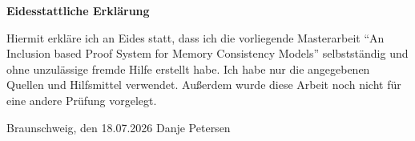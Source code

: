 \documentclass[a4paper,twoside,12pt, english]{article}
\begin{document}
\begin{appendix}


\end{appendix}
\pagebreak
\thispagestyle{empty}
\noindent \textbf{\large Eidesstattliche Erklärung} \\
\vspace{1.5cm} 

\noindent Hiermit erkläre ich an Eides statt, dass ich die vorliegende Masterarbeit \enquote{An Inclusion based Proof System for Memory Consistency Models} selbstständig und ohne unzulässige fremde Hilfe erstellt habe. Ich habe nur die angegebenen Quellen und Hilfsmittel verwendet. Außerdem wurde diese Arbeit noch nicht für eine andere Prüfung vorgelegt.\\

\vspace{2cm}

\noindent Braunschweig, den 18.07.2026 \hfill Danje Petersen \hspace{1cm}
%


\end{document}
